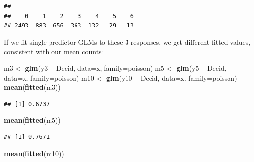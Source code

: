 \documentclass[12pt,]{book}
\newenvironment{Shaded}{\begin{snugshade}}{\end{snugshade}}
\newcommand{\DataTypeTok}[1]{\textcolor[rgb]{0.13,0.29,0.53}{#1}}
\newcommand{\KeywordTok}[1]{\textcolor[rgb]{0.13,0.29,0.53}{\textbf{#1}}}
\newcommand{\NormalTok}[1]{#1}
\newcommand{\OperatorTok}[1]{\textcolor[rgb]{0.81,0.36,0.00}{\textbf{#1}}}
\newcommand{\StringTok}[1]{\textcolor[rgb]{0.31,0.60,0.02}{#1}}
\begin{document}
\begin{Shaded}
\end{Shaded}

\begin{verbatim}
## 
##    0    1    2    3    4    5    6 
## 2493  883  656  363  132   29   13
\end{verbatim}

If we fit single-predictor GLMs to these 3 responses, we get
different fitted values, consistent with our mean counts:

\begin{Shaded}
\begin{Highlighting}[]
\NormalTok{m3 <-}\StringTok{ }\KeywordTok{glm}\NormalTok{(y3 }\OperatorTok{~}\StringTok{ }\NormalTok{Decid, }\DataTypeTok{data=}\NormalTok{x, }\DataTypeTok{family=}\NormalTok{poisson)}
\NormalTok{m5 <-}\StringTok{ }\KeywordTok{glm}\NormalTok{(y5 }\OperatorTok{~}\StringTok{ }\NormalTok{Decid, }\DataTypeTok{data=}\NormalTok{x, }\DataTypeTok{family=}\NormalTok{poisson)}
\NormalTok{m10 <-}\StringTok{ }\KeywordTok{glm}\NormalTok{(y10 }\OperatorTok{~}\StringTok{ }\NormalTok{Decid, }\DataTypeTok{data=}\NormalTok{x, }\DataTypeTok{family=}\NormalTok{poisson)}
\KeywordTok{mean}\NormalTok{(}\KeywordTok{fitted}\NormalTok{(m3))}
\end{Highlighting}
\end{Shaded}

\begin{verbatim}
## [1] 0.6737
\end{verbatim}

\begin{Shaded}
\begin{Highlighting}[]
\KeywordTok{mean}\NormalTok{(}\KeywordTok{fitted}\NormalTok{(m5))}
\end{Highlighting}
\end{Shaded}

\begin{verbatim}
## [1] 0.7671
\end{verbatim}

\begin{Shaded}
\begin{Highlighting}[]
\KeywordTok{mean}\NormalTok{(}\KeywordTok{fitted}\NormalTok{(m10))}
\end{Highlighting}
\end{Shaded}
\end{document}
